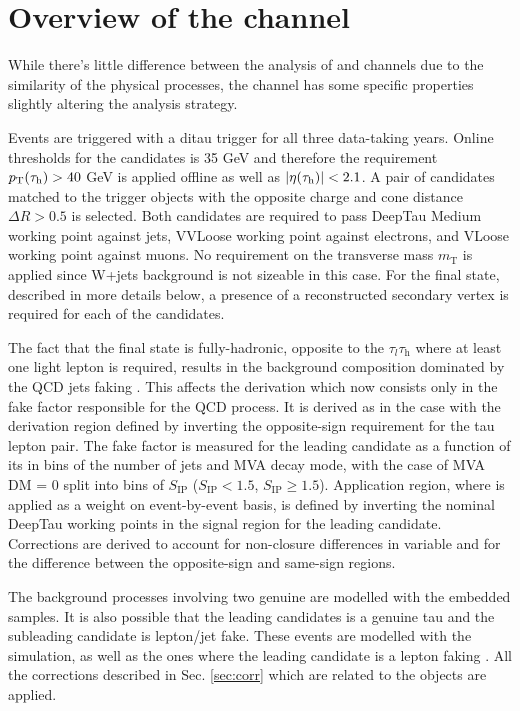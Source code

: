 \section{Overview of the \tata channel}\label{sec:tata}
While there's little difference between the analysis of \et and \mt channels due to the similarity of the physical processes, the \tata channel has some specific properties slightly altering the analysis strategy. 

Events are triggered with a ditau trigger for all three data-taking years. Online \pt thresholds for the candidates is 35 GeV and therefore the requirement $p_{\text{T}}(\tau_\mathrm{h}) > 40$ GeV is applied offline as well as $|\eta(\tau_\mathrm{h})| < 2.1$. A pair of \tauh candidates matched to the trigger objects with the opposite charge and cone distance $\Delta R > 0.5$ is selected. Both candidates are required to pass DeepTau Medium working point against jets, VVLoose working point against electrons, and VLoose working point against muons. No requirement on the transverse mass $m_\text{T}$ is applied since W+jets background is not sizeable in this case. For the \aaa final state, described in more details below, a presence of a reconstructed secondary vertex is required for each of the \tauh candidates.

The fact that the \tata final state is fully-hadronic, opposite to the $\tau_l\tau_\mathrm{h}$ where at least one light lepton is required, results in the background composition dominated by the QCD jets faking \tauh. This affects the \ff derivation which now consists only in the fake factor responsible for the QCD process. It is derived as in the \et case with the derivation region defined by inverting the opposite-sign requirement for the tau lepton pair. The fake factor is measured for the leading \tauh candidate as a function of its \pt in bins of the number of jets and MVA decay mode, with the case of MVA DM = 0 split into bins of $S_\text{IP}$ ($S_\text{IP} < 1.5$, $S_\text{IP} \ge 1.5$). Application region, where \ff is applied as a weight on event-by-event basis, is defined by inverting the nominal DeepTau working points in the signal region for the leading \tauh candidate. Corrections are derived to account for non-closure differences in \met variable and for the difference between the opposite-sign and same-sign regions. 

The background processes involving two genuine \tauh are modelled with the embedded samples. It is also possible that the leading \tauh candidates is a genuine tau and the subleading \tauh candidate is lepton/jet fake. These events are modelled with the simulation, as well as the ones where the leading \tauh candidate is a lepton faking \tauh. All the corrections described in Sec. \ref{sec:corr} which are related to the \tauh objects are applied.

